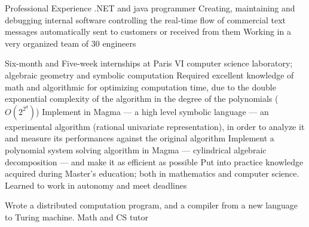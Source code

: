 \begin{rubric}{\color{ForestGreen} Professional Experience}
  .NET and java programmer
  Creating, maintaining and debugging internal software controlling the
  real-time flow of commercial
  text messages automatically sent to customers or received from them
  Working in a very organized team of 30 engineers


 Six-month and Five-week internships at Paris VI computer science laboratory;
 algebraic geometry and symbolic computation
  Required excellent knowledge of math and algorithmic for optimizing
  computation time, due to the double exponential complexity of the
  algorithm in the degree of the polynomials ($O(2^{2^d})$)
  \entry* Implement in Magma --- a high level symbolic language ---
  an experimental
  algorithm (rational univariate representation), in order to analyze it and
  measure its performances against the original algorithm
  \entry* Implement a polynomial system solving algorithm in Magma --- cylindrical algebraic decomposition --- and make it
  as efficient as possible
  \entry* Put into practice knowledge acquired during Master’s education;
  both in mathematics and computer science. Learned to work in autonomy
  and meet deadlines

 Wrote a distributed computation program, and a compiler from a new language to Turing machine.
  Math and CS tutor

\end{rubric}
